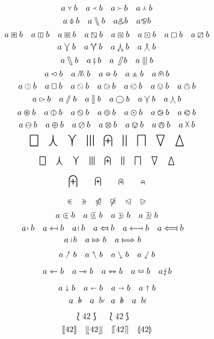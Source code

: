 \documentclass{article}
\begin{document}
\[
a \Ydown b \quad a \Yleft b \quad a \Yright b \quad a \Yup b
\]
\[
a \baro b \quad a \bbslash b \quad a \binampersand b \quad a \bindnasrepma b
\]
\[
a \boxast b \quad a \boxbar b \quad a \boxbox b \quad a \boxbslash b \quad a \boxcircle b \quad a \boxdot b \quad a \boxempty b \quad a \boxslash b
\]
\[
a \curlyveedownarrow b \quad a \curlyveeuparrow b \quad a \curlywedgedownarrow b \quad a \curlywedgeuparrow b
\]
\[
a \fatbslash b \quad a \fatsemi b \quad a \fatslash b \quad a \interleave b
\]
\[
a \leftslice b \quad a \merge b \quad a \minuso b \quad a \moo b \quad a \nplus b
\]
\[
a \obar b \quad a \oblong b \quad a \obslash b \quad a \ogreaterthan b \quad a \olessthan b \quad a \ovee b \quad a \owedge b
\]
\[
a \rightslice b \quad a \sslash b \quad a \talloblong b \quad a \varbigcirc b \quad a \varcurlyvee b \quad a \varcurlywedge b
\]
\[
a \varoast b \quad a \varobar b \quad a \varobslash b \quad a \varocircle b \quad a \varodot b \quad a \varogreaterthan b \quad a \varolessthan b
\]
\[
a \varominus b \quad a \varoplus b \quad a \varoslash b \quad a \varotimes b \quad a \varovee b \quad a \varowedge b \quad a \vartimes b
\]
\[
\bigbox \quad \bigcurlywedge \quad \bigcurlyvee \quad \biginterleave \quad \bignplus \quad \bigparallel \quad \bigsqcap \quad \bigtriangledown \quad \bigtriangleup
\]

\[\textstyle
\bigbox \quad \bigcurlywedge \quad \bigcurlyvee \quad \biginterleave \quad \bignplus \quad \bigparallel \quad \bigsqcap \quad \bigtriangledown \quad \bigtriangleup
\]

\[ {\displaystyle \bignplus}\qquad {\textstyle \bignplus}\qquad {\scriptstyle \bignplus}\qquad
{\scriptscriptstyle \bignplus}\]

\[
\inplus \quad \niplus \quad \ntrianglelefteqslant \quad \ntrianglerighteqslant \quad \trianglelefteqslant \quad \trianglerighteqslant
\]
\[
a \subsetplus b \quad a \subsetpluseq b \quad a \supsetplus b \quad a \supsetpluseq b
\]
\[
a \mapsfromchar b \quad
a \mapsfrom b \quad
a \Mapsfromchar b \quad
a \Mapsfrom b \quad
a \longmapsfrom b \quad
a \Longmapsfrom b \quad
\]
\[
a \Mapstochar b \quad
a \Mapsto b \quad
a \Longmapsto b \quad
\]

\[
a \nnearrow b \quad
a \nnwarrow b \quad
a \ssearrow b \quad
a \sswarrow b
\]

\[
a \leftarrowtriangle b \quad
a \rightarrowtriangle b \quad
a \leftrightarrowtriangle b \quad
a \leftrightarroweq b \quad
a \lightning b
\]

\[
a \shortdownarrow b \quad
a \shortleftarrow b \quad
a \shortrightarrow b \quad
a \shortuparrow b
\]
\[
a \arrownot b\quad
a \longarrownot b \quad
a \Arrownot b \quad
a \Longarrownot b
\]

\[
\Lbag 42 \Rbag \quad
\lbag 42 \rbag \quad
\]
\[
\llbracket 42 \rrbracket \quad
\llfloor 42 \rrfloor \quad
\llceil 42 \rrceil \quad
\llparenthesis 42 \rrparenthesis
\]
\varcopyright
\end{document}
